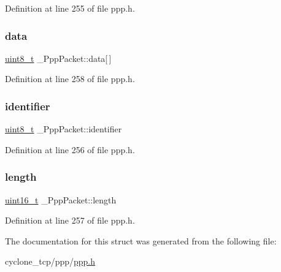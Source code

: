 Definition at line 255 of file ppp.\+h.

\mbox{\label{struct__PppPacket_abe3baab9c0ecb72abb01c6ed3550e942}} 
\subsubsection{\texorpdfstring{data}{data}}
{\footnotesize\ttfamily \hyperlink{stdint_8h_aba7bc1797add20fe3efdf37ced1182c5}{uint8\+\_\+t} \+\_\+\+Ppp\+Packet\+::data\mbox{[}$\,$\mbox{]}}



Definition at line 258 of file ppp.\+h.

\mbox{\label{struct__PppPacket_a734a4f5764bd33432d57f57e9745bbe5}} 
\subsubsection{\texorpdfstring{identifier}{identifier}}
{\footnotesize\ttfamily \hyperlink{stdint_8h_aba7bc1797add20fe3efdf37ced1182c5}{uint8\+\_\+t} \+\_\+\+Ppp\+Packet\+::identifier}



Definition at line 256 of file ppp.\+h.

\mbox{\label{struct__PppPacket_a03d503440e0bdda2779c01512d0c23fc}} 
\subsubsection{\texorpdfstring{length}{length}}
{\footnotesize\ttfamily \hyperlink{stdint_8h_a273cf69d639a59973b6019625df33e30}{uint16\+\_\+t} \+\_\+\+Ppp\+Packet\+::length}



Definition at line 257 of file ppp.\+h.



The documentation for this struct was generated from the following file\+:\begin{DoxyCompactItemize}
\item 
cyclone\+\_\+tcp/ppp/\hyperlink{ppp_8h}{ppp.\+h}\end{DoxyCompactItemize}
